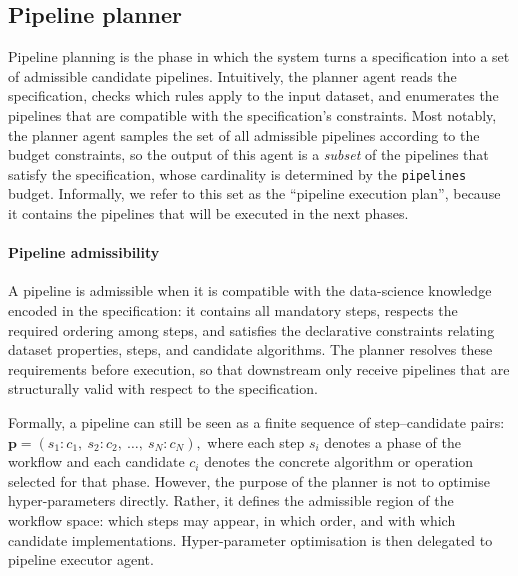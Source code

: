 \documentclass[runningheads]{llncs}
\begin{document}
\subsection{Pipeline planner}
\label{subsec:pipeline-planning}

Pipeline planning is the phase in which the system turns a specification into a set of admissible candidate pipelines.
%
Intuitively,
the planner agent reads the specification,
checks which rules apply to the input dataset,
and enumerates the pipelines that are compatible with the specification's constraints.
%
Most notably,
the planner agent samples the set of all admissible pipelines according to the budget constraints,
so the output of this agent is a \emph{subset} of the pipelines that satisfy the specification,
whose cardinality is determined by the \texttt{pipelines} budget.
%
Informally,
we refer to this set as the ``pipeline execution plan'',
because it contains the pipelines that will be executed in the next phases.

\paragraph{Pipeline admissibility}
%
A pipeline is admissible when it is compatible with the data-science knowledge encoded in the specification:
it contains all mandatory steps,
respects the required ordering among steps,
and satisfies the declarative constraints relating dataset properties,
steps,
and candidate algorithms.
%
%
The planner resolves these requirements before execution,
so that downstream only receive pipelines that are structurally valid with respect to the specification.

Formally,
a pipeline can still be seen as a finite sequence of step--candidate pairs:
%
$
  \mathbf{p}
  =
  (s_1:c_1,\ s_2:c_2,\ \ldots,\ s_N:c_N),
$
%
where each step $s_i$ denotes a phase of the workflow
and each candidate $c_i$ denotes the concrete algorithm or operation selected for that phase.
%
However,
the purpose of the planner is not to optimise hyper-parameters directly.
%
Rather,
it defines the admissible region of the workflow space:
which steps may appear,
in which order,
and with which candidate implementations.
%
Hyper-parameter optimisation is then delegated to pipeline executor agent.
\end{document}
